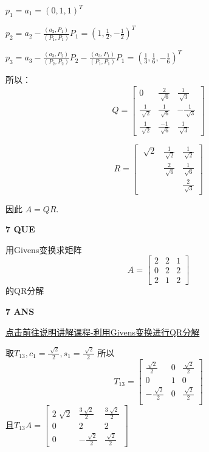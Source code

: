 \documentclass[11pt,letterpaper]{ctexart}
\begin{document}
\begin{enumerate}
$p_1 = a_1 = (0, 1, 1)^T$

$p_2 = a_2 - \frac{(a_2, P_1)}{(P_1, P_1)}P_1 = (1, \frac{1}{2}, -\frac{1}{2})^T$ 

$p_3 = a_3 - \frac{(a_3, P_2)}{(P_2, P_2)}P_2 - \frac{(a_3,P_1)}{(P_1, P_1)}P_1 = (\frac{1}{3}, \frac{1}{6}, -\frac{1}{6})^T$

所以： \[  Q = \begin{bmatrix}
	0 & \frac{2}{\sqrt[]{6}} &\frac{1}{\sqrt[]{3}} \\
	\frac{1}{\sqrt[]{2}} & \frac{1}{\sqrt[]{6}}& -\frac{1}{\sqrt[]{3}} \\
	\frac{1}{\sqrt[]{2}} & \frac{-1}{\sqrt[]{6}}& \frac{1}{\sqrt[]{3}} 
\end{bmatrix}\]

	\[ R = \begin{bmatrix}
		\sqrt[]{2} & \frac{1}{\sqrt[]{2}} & \frac{1}{\sqrt[]{2}} \\
		& \frac{2}{\sqrt[]{6}} & \frac{1}{\sqrt[]{6}} \\
		& & \frac{2}{\sqrt[]{3}}
	\end{bmatrix}\]

因此 $A = QR$.

\textbf{7 QUE}
\bigskip

用Givens变换求矩阵
\[ A = \begin{bmatrix}
	2 & 2 & 1 \\
	0 & 2 & 2\\
	2 & 1 & 2
\end{bmatrix}\]的QR分解

\textbf{7 ANS}
\bigskip
\raggedright{\href{https://www.bilibili.com/video/BV1eG4y1d7p4?vd_source=2fba6d5dce51e552f7fe3aa0508a4260}{点击前往说明讲解课程-利用Givens变换进行QR分解}}
\bigskip


取$T_{13}, c_1 = \frac{\sqrt[]{2}}{2}, s_1 = \frac{\sqrt[]{2}}{2}$ 所以 \[ T_{13} = \begin{bmatrix}
	\frac{\sqrt[]{2}}{2} & 0 & \frac{\sqrt[]{2}}{2}\\
	0 & 1 & 0 \\
	-\frac{\sqrt[]{2}}{2} & 0 & \frac{\sqrt[]{2}}{2} \\
\end{bmatrix}\]且$T_{13}A = \begin{bmatrix}
	2\sqrt[]{2} & \frac{3\sqrt[]{2}}{2} & \frac{3\sqrt[]{2}}{2} \\
	0 & 2  & 2 \\
	0 & -\frac{\sqrt[]{2}}{2} & \frac{\sqrt[]{2}}{2}
\end{bmatrix}$


\end{enumerate}
\end{document}

